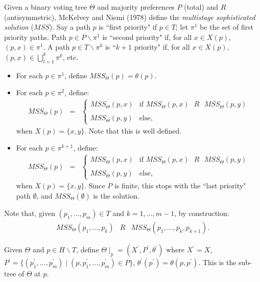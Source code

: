 \documentclass[12pt]{article}
\newcommand{\n}{\noindent}
\newcommand{\s}{\vspace{5mm}}
\begin{document}
\s
\n  Given a binary voting tree $\Theta$ and majority preferences $P$ (total) and $R$ (antisymmetric), McKelvey and Niemi (1978) define the \textit{multistage sophisticated solution} ($MSS$).  Say a path $p$ is ``first priority" if $p\in T$; let $\pi^{1}$ be the set of first priority paths.  Path $p\in P\backslash \pi^{1}$ is ``second priority" if, for all $x\in X(p)$, $(p,x)\in\pi^{1}$.  A path $p\in T\backslash\pi^{k}$ is ``$k+1$ priority" if, for all $x\in X(p)$, $(p,x)\in\bigcup_{l=1}^k\pi^k$, etc.
\begin{itemize}
\item For each $p\in\pi^1$, define $MSS_{\Theta}(p)=\theta(p)$.
\item For each $p\in\pi^2$, define:
\begin{eqnarray*}
MSS_{\Theta}(p)&=&\left\{\begin{array}{cl}
MSS_{\Theta}(p,x)& \mbox{if }MSS_{\Theta}(p,x)\mbox{ }R\mbox{ }MSS_{\Theta}(p,y)\\
&\\
MSS_{\Theta}(p,y)& \mbox{else},
\end{array}\right.
\end{eqnarray*} when $X(p)=\{x,y\}$.  Note that this is well defined.
\item For each $p\in\pi^{k+1}$, define:
\begin{eqnarray*}
MSS_{\Theta}(p)&=&\left\{\begin{array}{cl}
MSS_{\Theta}(p,x)&\mbox{if }MSS_{\Theta}(p,x)\mbox{ }R\mbox{ }MSS_{\Theta}(p,y)\\
&\\
MSS_{\Theta}(p,y)&\mbox{else},
\end{array}\right.
\end{eqnarray*} when $X(p)=\{x,y\}$.  Since $P$ is finite, this stops with the ``last priority" path $\emptyset$, and $MSS_{\Theta}(\emptyset)$ is the solution.
\end{itemize}  

\s
\n  Note that, given $(p_1,\hdots,p_m)\in T$ and $k=1,\hdots,m-1$, by construction:
\begin{eqnarray*}
MSS_{\Theta}(p_1,\hdots,p_k)&R&MSS_{\Theta}(p_1,\hdots,p_k,p_{k+1}).
\end{eqnarray*}

\s
\n  Given $\Theta$ and $p\in H\backslash T$, define $\Theta\mid_{p}=(X^{\prime},P^{\prime},\theta^{\prime})$ where $X^{\prime}=X$, $P^{\prime}=\{(p_1^{\prime},\hdots,p_m^{\prime})\mid (p,p_1^{\prime},\hdots,p_m^{\prime})\in P\}$, $\theta^{\prime}(p^{\prime})=\theta(p,p^{\prime})$.  This is the sub-tree of $\Theta$ at $p$.
\end{document}

